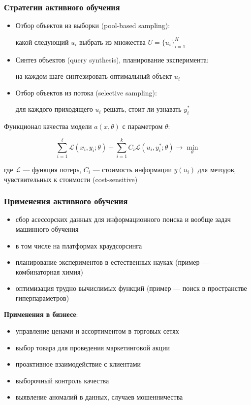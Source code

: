 \documentclass[fullscreen=true, bookmarks=true, hyperref={pdfencoding=unicode}]{beamer}
\begin{document}
\begin{frame}
  \frametitle{Стратегии активного обучения}

  \begin{itemize}
    \item {\color{brown} Отбор объектов из выборки (pool-based sampling)}:

    какой следующий $u_i$ выбрать из множества $U = \{u_i\}_{i=1}^K$

    \item {\color{brown} Синтез объектов (query synthesis), планирование эксперимента}:

    на каждом шаге синтезировать оптимальный объект $u_i$

    \item {\color{brown} Отбор объектов из потока (selective sampling)}:

    для каждого приходящего $u_i$ решать, стоит ли узнавать $y^*_i$
  \end{itemize}

    Функционал качества модели $a(x,\theta)$ с параметром $\theta$:

    $$ \sum\limits_{i=1}^\ell \mathscr{L}(x_i, y_i; \theta) + \sum\limits_{i=1}^k C_i \mathscr{L}(u_i, y_i^*; \theta) \to \min\limits_{\theta}$$

    где $\mathscr{L}$ — функция потерь, $C_i$ — стоимость информации $y(u_i)$ для методов, чувствительных к стоимости (cost-sensitive)

\end{frame}


\begin{frame}
  \frametitle{Применения активного обучения}

  \begin{itemize}
    \item сбор асессорских данных для информационного поиска и вообще задач машинного обучения
    \item в том числе на платформах краудсорсинга \item планирование экспериментов в естественных науках (пример — комбинаторная химия)
    \item оптимизация трудно вычислимых функций
      (пример — поиск в пространстве гиперпараметров)
  \end{itemize}

  {\bf Применения в бизнесе}:
  \begin{itemize}
    \item управление ценами и ассортиментом в торговых сетях
    \item выбор товара для проведения маркетинговой акции
    \item проактивное взаимодействие с клиентами
    \item выборочный контроль качества
    \item выявление аномалий в данных, случаев мошенничества
  \end{itemize}

\end{frame}
\end{document}
